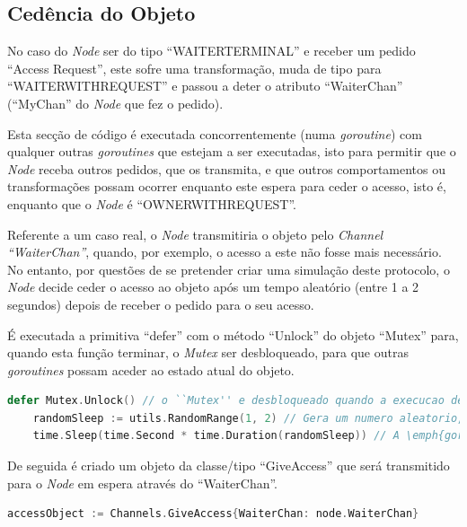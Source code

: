 \subsection*{Cedência do Objeto}
No caso do \emph{Node} ser do tipo ``WAITER\textunderscore TERMINAL'' e receber um pedido ``Access Request'', 
este sofre uma transformação, muda de tipo para ``WAITER\textunderscore WITH\textunderscore REQUEST'' e passou a deter o atributo ``WaiterChan'' (``MyChan'' do \emph{Node} que fez o pedido).

Esta secção de código é executada concorrentemente (numa \emph{goroutine}) com qualquer outras \emph{goroutines} 
que estejam a ser executadas,
isto para permitir que o \emph{Node} receba outros pedidos,
que os transmita, e que outros comportamentos ou transformações possam ocorrer 
enquanto este espera para ceder o acesso, isto é, enquanto que o \emph{Node} é ``OWNER\textunderscore WITH\textunderscore REQUEST''.


Referente a um caso real, o \emph{Node} transmitiria o objeto pelo \emph{Channel ``WaiterChan''}, quando, por exemplo, 
o acesso a este não fosse mais necessário.
No entanto, por questões de se pretender criar uma simulação deste protocolo, o \emph{Node} decide ceder o acesso ao objeto após um tempo aleatório (entre 1 a 2 segundos)
depois de receber o pedido para o seu acesso.

É executada a primitiva ``defer'' com o método ``Unlock'' do objeto ``Mutex'' para,
quando esta função terminar, o \emph{Mutex} ser desbloqueado, para que outras \emph{goroutines}
possam aceder ao estado atual do objeto.

\begin{lstlisting}[caption={\emph{Node} espera 1 ou 2 segundos antes de ceder o objeto.},language=Go]
	defer Mutex.Unlock() // o ``Mutex'' e desbloqueado quando a execucao deste metodo terminar
	randomSleep := utils.RandomRange(1, 2) // Gera um numero aleatorio, neste caso, 1 ou 2
	time.Sleep(time.Second * time.Duration(randomSleep)) // A \emph{goroutine} espera durante o tempo aleatorio gerado (em segundos)
\end{lstlisting}

De seguida é criado um objeto da classe/tipo ``GiveAccess'' que será transmitido para o \emph{Node} em espera 
através do ``WaiterChan''.

\begin{lstlisting}[caption={Criação do objeto ``accessObject'', da classe ``GiveAccess''},language=Go]
	accessObject := Channels.GiveAccess{WaiterChan: node.WaiterChan}
\end{lstlisting}


